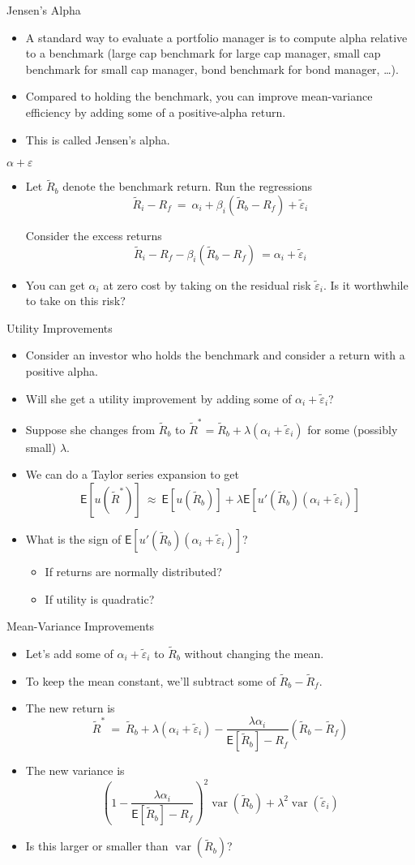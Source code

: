 \documentclass[10pt]{beamer}
\DeclareMathOperator{\var}{var}
\newcommand{\bi}{\begin{itemize}}
\newcommand{\ei}{\end{itemize}}
\newcommand{\im}{\item}
\newcommand{\mye}{\ensuremath{\mathsf{E}}}
\newcommand{\tve}{\tilde{\varepsilon}}
\newcommand{\tr}{\widetilde{R}}
\begin{document}

\begin{frame}{Jensen's Alpha}
    \bi 
\im A standard way to evaluate a portfolio manager is to compute alpha relative to a benchmark (large cap benchmark for large cap manager, small cap benchmark for small cap manager, bond benchmark for bond manager, \ldots).

\im Compared to holding the benchmark, you can improve mean-variance efficiency by adding some of a positive-alpha return.  

\im This is called Jensen's alpha.
\ei 
\end{frame}


\begin{frame}{$\alpha + \varepsilon$ }
\bi 
\im Let $\tr_b$ denote the benchmark return.  Run the regressions
$$\tr_i - R_f \ = \ \alpha_i + \beta_i (\tr_b-R_f) + \tve_i$$

Consider the excess returns
$$\tr_i - R_f -\beta_i (\tr_b-R_f) \ = \alpha_i + \tve_i$$

\im You can get $\alpha_i$ at zero cost by taking on the residual risk $\tve_i$.  Is it worthwhile to take on this risk?
\ei 
\end{frame}


\begin{frame}{Utility Improvements}
    \bi 
\im Consider an investor who holds the benchmark and consider a return with a positive alpha.

\im Will she get a utility improvement by adding some of $\alpha_i + \tve_i$?  

\im Suppose she changes from $\tr_b$ to $\tr^* = \tr_b + \lambda(\alpha_i+\tve_i)$ for some (possibly small) $\lambda$.

\im We can do a Taylor series expansion to get
$$\mye[u(\tr^*)] \ \approx \ \mye[u(\tr_b)] + \lambda \mye[u'(\tr_b)(\alpha_i+\tve_i)]$$
\im What is the sign of $\mye[u'(\tr_b)(\alpha_i+\tve_i)]$? 
\bi
\im \pause If returns are normally distributed?
\im \pause If utility is quadratic?
\ei
\ei 
\end{frame}


\begin{frame}{Mean-Variance Improvements}
    \bi 
\im Let's add some of $\alpha_i+\tve_i$ to $\tr_b$ without changing the mean.

\im To keep the mean constant, we'll subtract some of $\tr_b-\tr_f$.  \im The new return is
$$\tr^* \ = \ \tr_b + \lambda(\alpha_i+\tve_i) - \frac{\lambda\alpha_i}{\mye[\tr_b]-R_f}(\tr_b-\tr_f)$$

\im The new variance is
$$\left(1-\frac{\lambda\alpha_i}{\mye[\tr_b]-R_f}\right)^2\var(\tr_b) + \lambda^2\var(\tve_i)$$
\im Is this larger or smaller than $\var(\tr_b)$?
\ei 
\end{frame}
\end{document}
